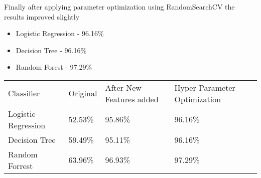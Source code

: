Finally after applying parameter optimization using RandomSearchCV the results improved slightly

\begin{itemize}
  \item Logistic Regression - 96.16\%
  \item Decision Tree - 96.16\%
  \item Random Forest - 97.29\%
\end{itemize}

\begin{table}[H]
\centering
\begin{tabular}{llll}
\rowcolor[HTML]{9B9B9B} 
Classifier                                  & Original & After New Features added & Hyper Parameter Optimization \\
\cellcolor[HTML]{C0C0C0}Logistic Regression & 52.53\%  & 95.86\%                  & 96.16\%                      \\
\cellcolor[HTML]{C0C0C0}Decision Tree       & 59.49\%  & 95.11\%                  & 96.16\%                      \\
\cellcolor[HTML]{C0C0C0}Random Forrest      & 63.96\%  & 96.93\%                  & 97.29\%                     
\end{tabular}
\end{table}

